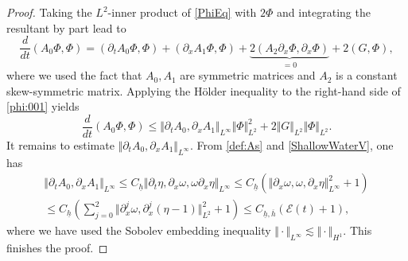\documentclass[10pt,a4paper]{amsart}
\newcommand{\norm}[2]{\Vert #1 \Vert_{#2}}
\begin{document}
\begin{proof}
    Taking the $ L^2 $-inner product of \eqref{PhiEq} with $ 2 \Phi $ and integrating the resultant by part lead to 
    \begin{equation}
        \label{phi:001}
        \dfrac{d}{dt} (A_0 \Phi, \Phi) =  (\partial_t A_0 \Phi, \Phi) + (\partial_x A_1 \Phi, \Phi) + \underbrace{2(A_2 \partial_x \Phi, \partial_x \Phi)}_{=0} + 2 (G,\Phi),
    \end{equation}
    where we used the fact that $ A_0, A_1 $ are symmetric matrices and $ A_2 $ is a constant skew-symmetric matrix. Applying the Hölder inequality to the right-hand side of \eqref{phi:001} yields
    \begin{equation}
    \label{phi:002}
        \dfrac{d}{dt}(A_0 \Phi, \Phi) \leq \norm{\partial_t A_0, \partial_x A_1}{L^\infty}\norm{\Phi}{L^2}^2 + 2 \norm{G}{L^2} \norm{\Phi}{L^2}. 
    \end{equation}
    It remains to estimate $ \norm{\partial_t A_0, \partial_x A_1}{L^\infty} $. From \eqref{def:As} and \eqref{ShallowWaterV}, one has
    \begin{equation}
        \label{phi:003}
        \begin{gathered}
        \norm{\partial_t A_0, \partial_x A_1}{L^\infty} \leq C_{\underline h} \norm{\partial_t \eta, \partial_x \omega, \omega \partial_x \eta}{L^\infty} \leq C_{\underline h} (\norm{\partial_x \omega, \omega,\partial_x \eta}{L^\infty}^2 + 1) \\
        \leq C_{\underline h} (\sum_{j=0}^2 \norm{\partial_x^j \omega, \partial_x^j (\eta-1)}{L^2}^2 + 1) \leq C_{\underline h, \overline h} (\mathcal E(t) + 1),
        \end{gathered}
    \end{equation}
    where we have used the Sobolev embedding inequality $ \norm{\cdot}{L^\infty} \lesssim \norm{\cdot }{H^1} $. 
    This finishes the proof. 
\end{proof}
\end{document}
